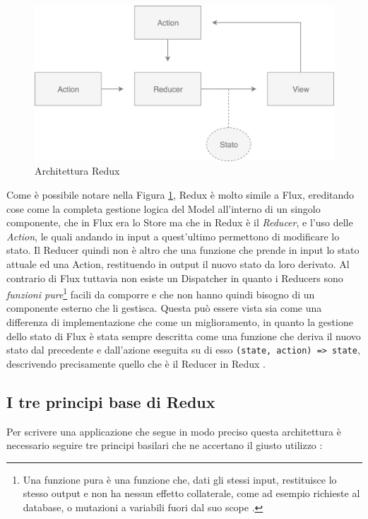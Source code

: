 \begin{figure}[h]
\centering
\vspace*{0.5cm} 
\includegraphics[width=11.5cm]{./images/ReduxWorkflow}
\caption{Architettura Redux}
\label{ReduxWorkflow}
\vspace*{0.5cm} 
\end{figure}

\noindent
Come è possibile notare nella Figura \ref{ReduxWorkflow}, Redux è molto simile a Flux, ereditando cose come la completa gestione logica del Model all'interno di un singolo componente, che in Flux era lo Store ma che in Redux è il \textit{Reducer}, e l'uso delle \textit{Action}, le quali andando in input a quest'ultimo permettono di modificare lo stato. Il Reducer quindi non è altro che una funzione che prende in input lo stato attuale ed una Action, restituendo in output il nuovo stato da loro derivato.
Al contrario di Flux tuttavia non esiste un Dispatcher in quanto i Reducers sono \textit{funzioni pure}\footnote{Una funzione pura è una funzione che, dati gli stessi input, restituisce lo stesso output e non ha nessun effetto collaterale, come ad esempio richieste al database, o mutazioni a variabili fuori dal suo scope \cite{FranklinOnPureFunctions}.} facili da comporre e che non hanno quindi bisogno di un componente esterno che li gestisca. Questa può essere vista sia come una differenza di implementazione che come un miglioramento, in quanto la gestione dello stato di Flux è stata sempre descritta come una funzione che deriva il nuovo stato dal precedente e dall'azione eseguita su di esso \texttt{(state, action) => state}, descrivendo precisamente quello che è il Reducer in Redux \cite{ReduxDocumentation}.

\subsection{I tre principi base di Redux}
Per scrivere una applicazione che segue in modo preciso questa architettura è necessario seguire tre principi basilari che ne accertano il giusto utilizzo \cite{ReduxDocumentation}:

